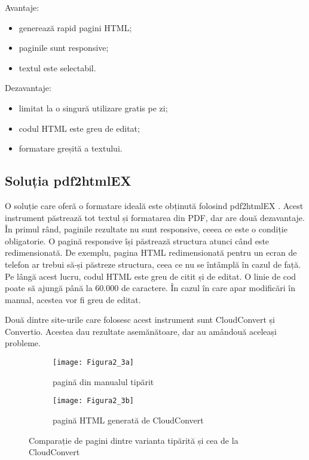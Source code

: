 \noindent
Avantaje:
\begin{itemize}
	\item generează rapid pagini HTML;
	\item paginile sunt responsive;
	\item textul este selectabil.
\end{itemize}

\noindent
Dezavantaje:
\begin{itemize}
	\item limitat la o singură utilizare gratis pe zi;
	\item codul HTML este greu de editat;
	\item formatare greșită a textului.
\end{itemize}

\subsection{Soluția pdf2htmlEX}

O soluție care oferă o formatare ideală este obținută folosind pdf2htmlEX \cite{wang2013online}. Acest instrument păstrează tot textul și formatarea din PDF, dar are două dezavantaje. În primul rând, paginile rezultate nu sunt responsive, ceeea ce este o condiție obligatorie. O pagină responsive își păstrează structura atunci când este redimensionată. De exemplu, pagina HTML redimensionată pentru un ecran de telefon ar trebui să-și păstreze structura, ceea ce nu se întâmplă în cazul de față. Pe lângă acest lucru, codul HTML este greu de citit și de editat. O linie de cod poate să ajungă până la 60.000 de caractere. În cazul în care apar modificări în manual, acestea vor fi greu de editat.

Două dintre site-urile care folosesc acest instrument sunt CloudConvert și Convertio. Acestea dau rezultate asemănătoare, dar au amândouă aceleași probleme.
\begin{figure}[H]
	\centering
	\begin{subfigure}{.5\textwidth}
		\centering
		\texttt{[image: Figura2\_3a]}
		\caption{pagină din manualul tipărit}
		\label{fig:Figura2_3a}
	\end{subfigure}%
	\begin{subfigure}{.5\textwidth}
		\centering
		\texttt{[image: Figura2\_3b]}
		\caption{pagină HTML generată de CloudConvert}
		\label{fig:Figura2_3b}
	\end{subfigure}
	\caption{Comparație de pagini dintre varianta tipărită și cea de la CloudConvert}
	\label{fig:Figura2_3}
\end{figure}

